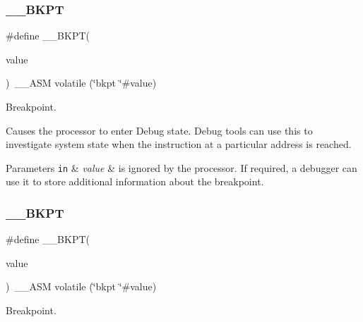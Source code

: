 \subsubsection{\texorpdfstring{\+\_\+\+\_\+\+B\+K\+PT}{\_\_BKPT}\hspace{0.1cm}{\footnotesize\ttfamily [2/3]}}
{\footnotesize\ttfamily \#define \+\_\+\+\_\+\+B\+K\+PT(\begin{DoxyParamCaption}\item[{}]{value }\end{DoxyParamCaption})~\+\_\+\+\_\+\+A\+SM volatile (\char`\"{}bkpt \char`\"{}\#value)}



Breakpoint. 

Causes the processor to enter Debug state. Debug tools can use this to investigate system state when the instruction at a particular address is reached. 
\begin{DoxyParams}[1]{Parameters}
\mbox{\tt in}  & {\em value} & is ignored by the processor. If required, a debugger can use it to store additional information about the breakpoint. \\
\hline
\end{DoxyParams}
\mbox{\label{group___c_m_s_i_s___core___instruction_interface_ga15ea6bd3c507d3e81c3b3a1258e46397}} 
\subsubsection{\texorpdfstring{\+\_\+\+\_\+\+B\+K\+PT}{\_\_BKPT}\hspace{0.1cm}{\footnotesize\ttfamily [3/3]}}
{\footnotesize\ttfamily \#define \+\_\+\+\_\+\+B\+K\+PT(\begin{DoxyParamCaption}\item[{}]{value }\end{DoxyParamCaption})~\+\_\+\+\_\+\+A\+SM volatile (\char`\"{}bkpt \char`\"{}\#value)}



Breakpoint. 

